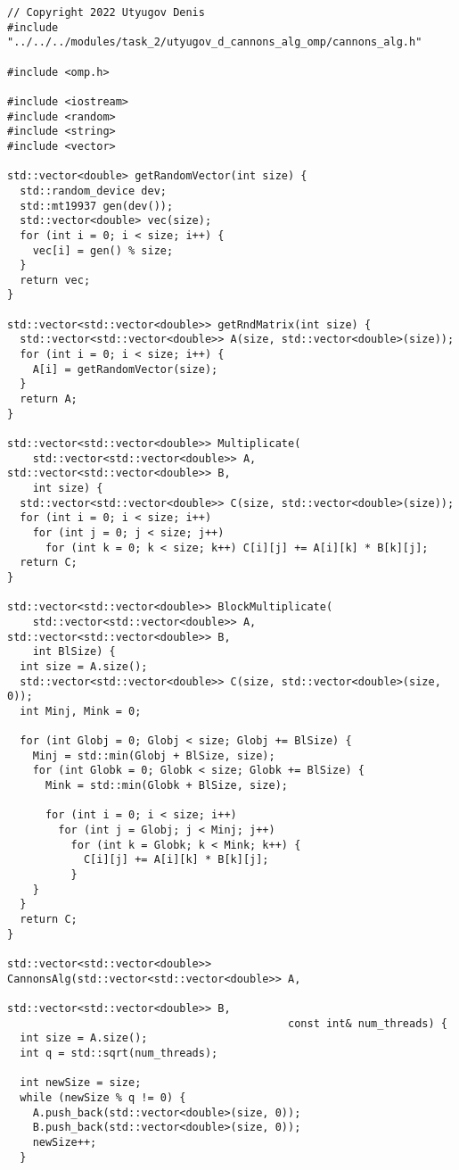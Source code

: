 \documentclass{report}
\begin{document}
\begin{lstlisting}
// Copyright 2022 Utyugov Denis
#include "../../../modules/task_2/utyugov_d_cannons_alg_omp/cannons_alg.h"

#include <omp.h>

#include <iostream>
#include <random>
#include <string>
#include <vector>

std::vector<double> getRandomVector(int size) {
  std::random_device dev;
  std::mt19937 gen(dev());
  std::vector<double> vec(size);
  for (int i = 0; i < size; i++) {
    vec[i] = gen() % size;
  }
  return vec;
}

std::vector<std::vector<double>> getRndMatrix(int size) {
  std::vector<std::vector<double>> A(size, std::vector<double>(size));
  for (int i = 0; i < size; i++) {
    A[i] = getRandomVector(size);
  }
  return A;
}

std::vector<std::vector<double>> Multiplicate(
    std::vector<std::vector<double>> A, std::vector<std::vector<double>> B,
    int size) {
  std::vector<std::vector<double>> C(size, std::vector<double>(size));
  for (int i = 0; i < size; i++)
    for (int j = 0; j < size; j++)
      for (int k = 0; k < size; k++) C[i][j] += A[i][k] * B[k][j];
  return C;
}

std::vector<std::vector<double>> BlockMultiplicate(
    std::vector<std::vector<double>> A, std::vector<std::vector<double>> B,
    int BlSize) {
  int size = A.size();
  std::vector<std::vector<double>> C(size, std::vector<double>(size, 0));
  int Minj, Mink = 0;

  for (int Globj = 0; Globj < size; Globj += BlSize) {
    Minj = std::min(Globj + BlSize, size);
    for (int Globk = 0; Globk < size; Globk += BlSize) {
      Mink = std::min(Globk + BlSize, size);

      for (int i = 0; i < size; i++)
        for (int j = Globj; j < Minj; j++)
          for (int k = Globk; k < Mink; k++) {
            C[i][j] += A[i][k] * B[k][j];
          }
    }
  }
  return C;
}

std::vector<std::vector<double>> CannonsAlg(std::vector<std::vector<double>> A,
                                            std::vector<std::vector<double>> B,
                                            const int& num_threads) {
  int size = A.size();
  int q = std::sqrt(num_threads);

  int newSize = size;
  while (newSize % q != 0) {
    A.push_back(std::vector<double>(size, 0));
    B.push_back(std::vector<double>(size, 0));
    newSize++;
  }


\end{lstlisting}
\end{document}
